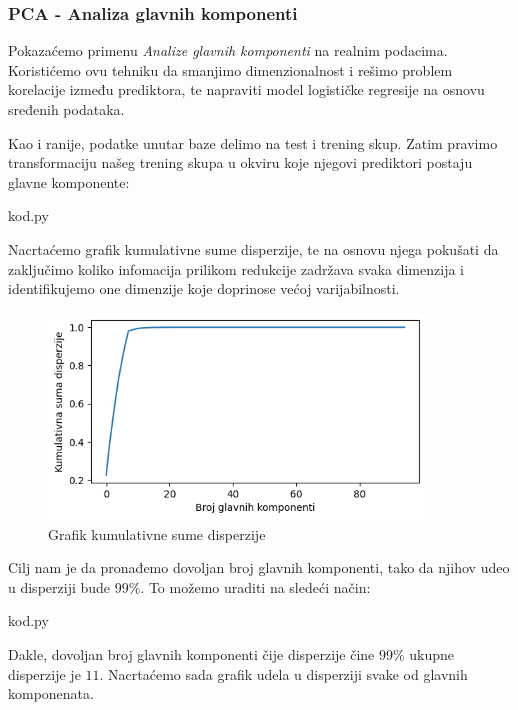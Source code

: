 \documentclass[12pt]{article}
\theoremstyle{definition}
\theoremstyle{remark}
\begin{document}
\subsubsection{PCA - Analiza glavnih komponenti}

Pokazaćemo primenu \emph{Analize glavnih komponenti} na realnim podacima. Koristićemo ovu tehniku da smanjimo dimenzionalnost i rešimo problem korelacije između prediktora, te napraviti model logističke regresije na osnovu sređenih podataka.


Kao i ranije, podatke unutar baze delimo na test i trening skup. Zatim pravimo transformaciju našeg trening skupa u okviru koje njegovi prediktori postaju glavne komponente:

\hfill

{kod.py}

\hfill

Nacrtaćemo grafik kumulativne sume disperzije, te na osnovu njega pokušati da zaključimo koliko infomacija prilikom redukcije zadržava svaka dimenzija i identifikujemo one dimenzije koje doprinose većoj varijabilnosti. 

\begin{figure}[htp]
    \centering
    \includegraphics[width=10cm]{output_31_0.png}
    \caption{Grafik kumulativne sume disperzije}
    \label{fig:galaxy}
\end{figure}

\newpage

Cilj nam je da pronađemo dovoljan broj glavnih komponenti, tako da njihov udeo u disperziji bude $99\%$. To možemo uraditi na sledeći način:

\hfill

{kod.py}

\hfill

Dakle, dovoljan broj glavnih komponenti čije disperzije čine $99\%$ ukupne disperzije je $11$. Nacrtaćemo sada grafik udela u disperziji svake od glavnih komponenata.
\end{document}
